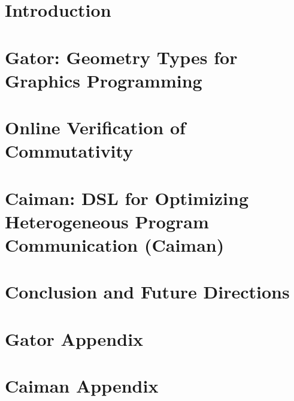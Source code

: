 \documentclass[phd,tocprelim]{cornell}
\begin{document}
\chapter{Introduction}



\chapter{Gator: Geometry Types for Graphics Programming}



\chapter{Online Verification of Commutativity}



\chapter{Caiman: DSL for Optimizing Heterogeneous Program Communication (Caiman)}



\chapter{Conclusion and Future Directions}


\appendix

\chapter{Gator Appendix}


\chapter{Caiman Appendix}




\end{document}
